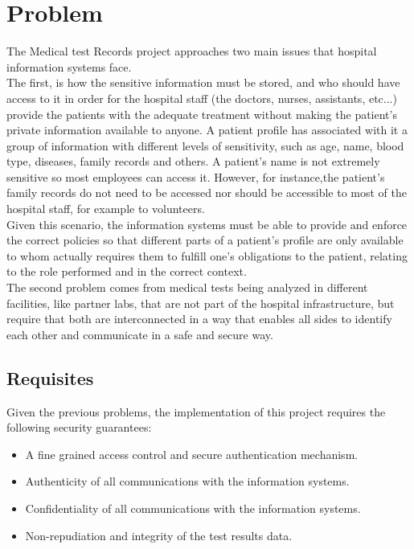 \section{Problem}

The Medical test Records project approaches two main issues that hospital information systems face. \\

The first, is how the sensitive information must be stored,  and who should have access to it in order for the hospital staff (the doctors, nurses, assistants, etc...) provide the patients with the adequate treatment without making the patient's private information available to anyone.
A patient profile has associated with it a group of information with different levels of sensitivity, such as age, name, blood type, diseases, family records and others.
A patient's name is not extremely sensitive so most employees can access it. However, for instance,the patient's family records do not need to be accessed nor should be accessible to most of the hospital staff, for example to volunteers. \\

Given this scenario, the information systems  must be able to provide and enforce the correct policies so that different parts of a patient's profile are only available to whom actually requires them to fulfill one's obligations to the patient, relating to the role performed and in the correct context. \\

The second problem comes from medical tests being analyzed in different facilities, like partner labs, that are not part of the hospital infrastructure, but require that both are interconnected in a way that enables all sides to identify each other and communicate in a safe and secure way. \\

\subsection{Requisites}

Given the previous problems, the implementation of this project requires the following security guarantees:
\begin{itemize}
	\item A fine grained access control and secure authentication mechanism.
	\item Authenticity of all communications with the information systems.
	\item Confidentiality of all communications with the information systems.
	\item Non-repudiation and integrity of the test results data.
\end{itemize}

